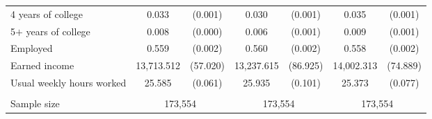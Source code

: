 \begin{tabular}{lcccccc}
 \hspace{0.3cm} 4 years of college   & 0.033 & (0.001)  & 0.030 & (0.001)  & 0.035 & (0.001)  \\
 \hspace{0.3cm} 5$+$ years of college   & 0.008 & (0.000)  & 0.006 & (0.001)  & 0.009 & (0.001)  \\
 Employed   & 0.559 & (0.002)  & 0.560 & (0.002)  & 0.558 & (0.002)  \\
 Earned income   & 13,713.512 & (57.020)  & 13,237.615 & (86.925)  & 14,002.313 & (74.889)  \\
 Usual weekly hours worked   & 25.585 & (0.061)  & 25.935 & (0.101)  & 25.373 & (0.077)  \\
\\
Sample size & \multicolumn{2}{c}{173,554} & \multicolumn{2}{c}{173,554} & \multicolumn{2}{c}{173,554} \\
\bottomrule
\bottomrule
\end{tabular}